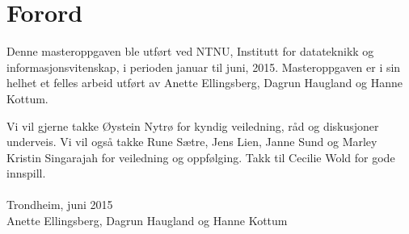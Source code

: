 \chapter*{Forord}

Denne masteroppgaven ble utført ved NTNU, Institutt for datateknikk og informasjonsvitenskap, i perioden januar til juni, 2015. 
Masteroppgaven er i sin helhet et felles arbeid utført av Anette Ellingsberg, Dagrun Haugland og Hanne Kottum. 

Vi vil gjerne takke Øystein Nytrø for kyndig veiledning, råd og diskusjoner underveis. Vi vil også takke Rune Sætre, Jens Lien, Janne Sund og Marley Kristin Singarajah for veiledning og oppfølging. Takk til Cecilie Wold for gode innspill. \\ \mbox{}\\[4pc]

Trondheim, juni 2015\\
Anette Ellingsberg, Dagrun Haugland og Hanne Kottum

\clearpage